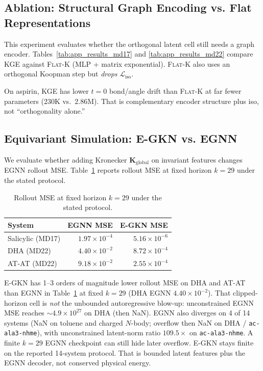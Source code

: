\documentclass{article}
\newcommand{\K}{\mathbf{K}}
\newcommand{\GKE}{\textsc{KGE}}
\newcommand{\EGKN}{\textsc{E-GKN}}
\newcommand{\EGNN}{\textsc{EGNN}}
\newcommand{\FKoop}{\textsc{Flat-K}}
\begin{document}
\subsection{Ablation: Structural Graph Encoding vs. Flat Representations}
\label{sec:ablation}

This experiment evaluates whether the orthogonal latent cell still needs a graph encoder. Tables~\ref{tab:app_results_md17} and \ref{tab:app_results_md22} compare \GKE{} against \FKoop{} (MLP + matrix exponential). \FKoop{} also uses an orthogonal Koopman step but \emph{drops} $\mathcal{L}_{\text{iso}}$.

On aspirin, \GKE{} has lower $t=0$ bond/angle drift than \FKoop{} at far fewer parameters (230K vs.\ 2.86M). That is complementary encoder structure plus iso, not ``orthogonality alone.''

\subsection{Equivariant Simulation: E-GKN vs. EGNN}
\label{sec:egkn_results}

We evaluate whether adding Kronecker $\K_{\text{global}}$ on invariant features changes EGNN rollout MSE. Table~\ref{tab:egkn} reports rollout MSE at fixed horizon $k=29$ under the stated protocol.

\begin{table}[htbp]
\centering
\caption{Rollout MSE at fixed horizon $k=29$ under the stated protocol.}
\label{tab:egkn}
\begin{tabular}{lrr}
\toprule
\textbf{System} & \textbf{EGNN MSE} & \textbf{E-GKN MSE} \\
\midrule
Salicylic (MD17) & $1.97\times 10^{-4}$ & $5.16\times 10^{-6}$ \\
DHA (MD22) & $4.40\times 10^{-2}$ & $8.72\times 10^{-4}$ \\
AT-AT (MD22) & $9.18\times 10^{-2}$ & $2.55\times 10^{-4}$ \\
\bottomrule
\end{tabular}
\end{table}

\EGKN{} has 1--3 orders of magnitude lower rollout MSE on DHA and AT-AT than \EGNN{} in Table~\ref{tab:egkn} at fixed $k=29$ (DHA \EGNN{} $4.40\times 10^{-2}$). That clipped-horizon cell is \emph{not} the unbounded autoregressive blow-up: unconstrained \EGNN{} MSE reaches $\sim 4.9 \times 10^{27}$ on DHA (then NaN). \EGNN{} also diverges on 4 of 14 systems (NaN on toluene and charged $N$-body; overflow then NaN on DHA / \texttt{ac-ala3-nhme}), with unconstrained latent-norm ratio $109.5\times$ on \texttt{ac-ala3-nhme}. A finite $k=29$ \EGNN{} checkpoint can still hide later overflow. \EGKN{} stays finite on the reported 14-system protocol. That is bounded latent features plus the EGNN decoder, not conserved physical energy.
\end{document}

